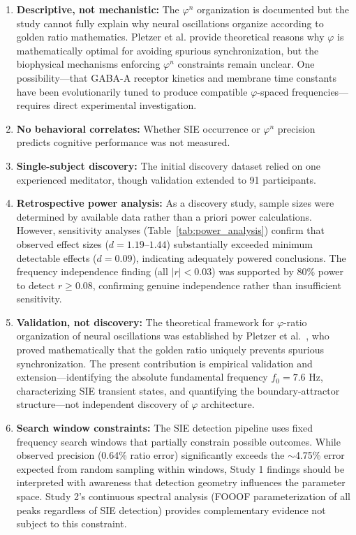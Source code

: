 \documentclass[11pt,a4paper]{article}
\newcommand{\phisym}{\varphi}
\begin{document}
\begin{enumerate}
    \item \textbf{Descriptive, not mechanistic:} The $\phisym^n$ organization is documented but the study cannot fully explain why neural oscillations organize according to golden ratio mathematics. Pletzer et al. \parencite{pletzer2010golden} provide theoretical reasons why $\phisym$ is mathematically optimal for avoiding spurious synchronization, but the biophysical mechanisms enforcing $\phisym^n$ constraints remain unclear. One possibility---that GABA-A receptor kinetics and membrane time constants have been evolutionarily tuned to produce compatible $\phisym$-spaced frequencies---requires direct experimental investigation.

    \item \textbf{No behavioral correlates:} Whether SIE occurrence or $\phisym^n$ precision predicts cognitive performance was not measured.

    \item \textbf{Single-subject discovery:} The initial discovery dataset relied on one experienced meditator, though validation extended to 91 participants.

    \item \textbf{Retrospective power analysis:} As a discovery study, sample sizes were determined by available data rather than a priori power calculations. However, sensitivity analyses (Table~\ref{tab:power_analysis}) confirm that observed effect sizes ($d = 1.19$--$1.44$) substantially exceeded minimum detectable effects ($d = 0.09$), indicating adequately powered conclusions. The frequency independence finding (all $|r| < 0.03$) was supported by 80\% power to detect $r \geq 0.08$, confirming genuine independence rather than insufficient sensitivity.

    \item \textbf{Validation, not discovery:} The theoretical framework for $\phisym$-ratio organization of neural oscillations was established by Pletzer et al.\ \parencite{pletzer2010golden}, who proved mathematically that the golden ratio uniquely prevents spurious synchronization. The present contribution is empirical validation and extension---identifying the absolute fundamental frequency $f_0 = 7.6$ Hz, characterizing SIE transient states, and quantifying the boundary-attractor structure---not independent discovery of $\phisym$ architecture.

    \item \textbf{Search window constraints:} The SIE detection pipeline uses fixed frequency search windows that partially constrain possible outcomes. While observed precision (0.64\% ratio error) significantly exceeds the $\sim$4.75\% error expected from random sampling within windows, Study 1 findings should be interpreted with awareness that detection geometry influences the parameter space. Study 2's continuous spectral analysis (FOOOF parameterization of all peaks regardless of SIE detection) provides complementary evidence not subject to this constraint.
\end{enumerate}
\end{document}
